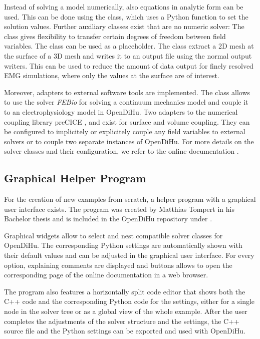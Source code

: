 Instead of solving a model numerically, also equations in analytic form can be used. This can be done using the  class, which uses a Python function to set the solution values. Further auxiliary classes exist that are no numeric solver: The  class gives flexibility to transfer certain degrees of freedom between field variables. The  class can be used as a placeholder. The  class extract a 2D mesh at the surface of a 3D mesh and writes it to an output file using the normal output writers. This can be used to reduce the amount of data output for finely resolved EMG simulations, where only the values at the surface are of interest.

Moreover, adapters to external software tools are implemented. The class  allows to use the solver \emph{FEBio} \cite{Maas2012,maas2017febio} for solving a continuum mechanics model and couple it to an electrophysiology model in OpenDiHu.
Two adapters to the numerical coupling library preCICE \cite{precice},  and  exist for surface and volume coupling. They can be configured to implicitely or explicitely couple any field variables to external solvers or to couple two separate instances of OpenDiHu.
For more details on the solver classes and their configuration, we refer to the online documentation \cite{opendihuWeb}.

\subsection{Graphical Helper Program}
For the creation of new examples from scratch, a helper program with a graphical user interface exists. The program was created by Matthias Tompert in his Bachelor thesis and is included in the OpenDiHu repository under .

Graphical widgets allow to select and nest compatible solver classes for OpenDiHu. The corresponding Python settings are automatically shown with their default values and can be adjusted in the graphical user interface. For every option, explaining comments are displayed and buttons allows to open the corresponding page of the online documentation in a web browser.

The program also features a horizontally split code editor that shows both the C++ code and the corresponding Python code for the settings, either for a single node in the solver tree or as a global view of the whole example. 
After the user completes the adjustments of the solver structure and the settings, the C++ source file and the Python settings can be exported and used with OpenDiHu.

